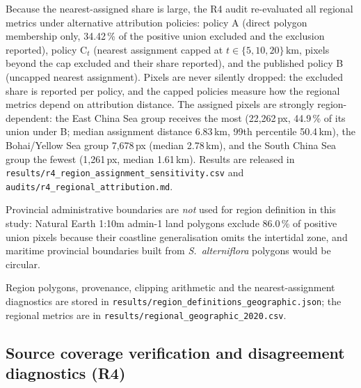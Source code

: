 \documentclass[11pt]{article}
\begin{document}
Because the nearest-assigned share is large, the R4 audit re-evaluated all
regional metrics under alternative attribution policies: policy A (direct
polygon membership only, 34.42\,\% of the positive union excluded and the
exclusion reported), policy C$_t$ (nearest assignment capped at
$t \in \{5, 10, 20\}$\,km, pixels beyond the cap excluded and their share
reported), and the published policy B (uncapped nearest assignment). Pixels
are never silently dropped: the excluded share is reported per policy, and
the capped policies measure how the regional metrics depend on attribution
distance. The assigned pixels are strongly region-dependent: the East China
Sea group receives the most (22,262\,px, 44.9\,\% of its union under B;
median assignment distance 6.83\,km, 99th percentile 50.4\,km), the
Bohai/Yellow Sea group 7,678\,px (median 2.78\,km), and the South China Sea
group the fewest (1,261\,px, median 1.61\,km). Results are released in
\texttt{results/r4\_region\_assignment\_sensitivity.csv} and
\texttt{audits/r4\_regional\_attribution.md}.

Provincial administrative boundaries are \emph{not} used for region definition
in this study: Natural Earth 1:10m admin-1 land polygons exclude 86.0\,\% of
positive union pixels because their coastline generalisation omits the
intertidal zone, and maritime provincial boundaries built from
\textit{S.~alterniflora} polygons would be circular\citep{olofsson_2014_area_bias}.

Region polygons, provenance, clipping arithmetic and the nearest-assignment
diagnostics are stored in \texttt{results/region\_definitions\_geographic.json};
the regional metrics are in \texttt{results/regional\_geographic\_2020.csv}.

\subsection{Source coverage verification and disagreement diagnostics (R4)}
\label{sec:methods-coverage}
\end{document}
